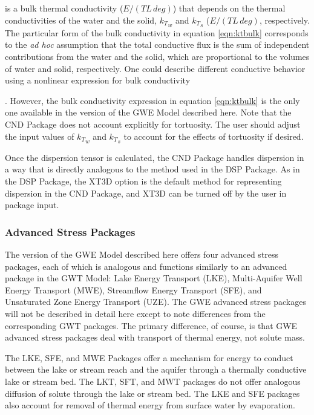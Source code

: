 \noindent is a bulk thermal conductivity ($E/(T L \, deg)$) that depends on the thermal conductivities of the water and the solid, ${k_T}_w$ and ${k_T}_s$  ($E/(T L \, deg)$, respectively. The particular form of the bulk conductivity in equation \ref{eqn:ktbulk} corresponds to the \textit{ad hoc} assumption that the total conductive flux is the sum of independent contributions from the water and the solid, which are proportional to the volumes of water and solid, respectively. One could describe different conductive behavior using a nonlinear expression for bulk conductivity {\cite{campbell1994, markle2006}.  However, the bulk conductivity expression in equation \ref{eqn:ktbulk} is the only one available in the version of the GWE Model described here. Note that the CND Package does not account explicitly for tortuosity. The user should adjust the input values of ${k_T}_w$ and ${k_T}_s$ to account for the effects of tortuosity if desired.

Once the dispersion tensor is calculated, the CND Package handles dispersion in a way that is directly analogous to the method used in the DSP Package. As in the DSP Package, the XT3D option is the default method for representing dispersion in the CND Package, and XT3D can be turned off by the user in package input.

\subsubsection{Advanced Stress Packages}

The version of the GWE Model described here offers four advanced stress packages, each of which is analogous and functions similarly to an advanced package in the GWT Model: Lake Energy Transport (LKE), Multi-Aquifer Well Energy Transport (MWE), Streamflow Energy Transport (SFE), and Unsaturated Zone Energy Transport (UZE). The GWE advanced stress packages will not be described in detail here except to note differences from the corresponding GWT packages. The primary difference, of course, is that GWE advanced stress packages deal with transport of thermal energy, not solute mass.

The LKE, SFE, and MWE Packages offer a mechanism for energy to conduct between the lake or stream reach and the aquifer through a thermally conductive lake or stream bed. The LKT, SFT, and MWT packages do not offer analogous diffusion of solute through the lake or stream bed. The LKE and SFE packages also account for removal of thermal energy from surface water by evaporation.

}

